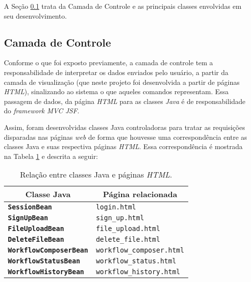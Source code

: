 A Seção \ref{cap5sec4subsec3} trata da Camada de Controle e as principais classes envolvidas em seu desenvolvimento.

\subsection{Camada de Controle} \label{cap5sec4subsec3}

Conforme o que foi exposto previamente, a camada de controle tem a responsabilidade de interpretar os dados enviados pelo usuário, a partir da camada de visualização (que neste projeto foi desenvolvida a partir de páginas \textit{HTML}), sinalizando ao sistema o que aqueles comandos representam. Essa passagem de dados, da página \textit{HTML} para as classes \textit{Java} é de responsabilidade do \textit{framework MVC JSF}.

Assim, foram desenvolvidas classes Java controladoras para tratar as requisições disparadas nas páginas \textit{web} de forma que houvesse uma correspondência entre as classes Java e suas respectiva páginas \textit{HTML}. Essa correspondência é mostrada na Tabela \ref{tab:tabela_java_paginas} e descrita a seguir:

\begin{table}[H]
\centering
\begin{tabular}{||c|c||}
\hline
\textbf{Classe Java} & \textbf{Página relacionada}  \\
\hline
\hline
\multicolumn{1}{||l|}{\textbf{\texttt{SessionBean}}}				& \multicolumn{1}{l||}{\texttt{login.html}} \\ 
\hline
\multicolumn{1}{||l|}{\textbf{\texttt{SignUpBean}}}				& \multicolumn{1}{l||}{\texttt{sign\_up.html}} \\
\hline
\multicolumn{1}{||l|}{\textbf{\texttt{FileUploadBean}}}			& \multicolumn{1}{l||}{\texttt{file\_upload.html}} \\  
\hline
\multicolumn{1}{||l|}{\textbf{\texttt{DeleteFileBean}}} 			& \multicolumn{1}{l||}{\texttt{delete\_file.html}} \\ 
\hline
\multicolumn{1}{||l|}{\textbf{\texttt{WorkflowComposerBean}}} 	& \multicolumn{1}{l||}{\texttt{workflow\_composer.html}}      \\ 
\hline
\multicolumn{1}{||l|}{\textbf{\texttt{WorkflowStatusBean}}}		& \multicolumn{1}{l||}{\texttt{workflow\_status.html}}        \\ 
\hline
\multicolumn{1}{||l|}{\textbf{\texttt{WorkflowHistoryBean}}}		& \multicolumn{1}{l||}{\texttt{workflow\_history.html}}        \\
\hline
\end{tabular}
\caption{Relação entre classes Java e páginas \textit{HTML}.}
\label{tab:tabela_java_paginas}
\end{table}

